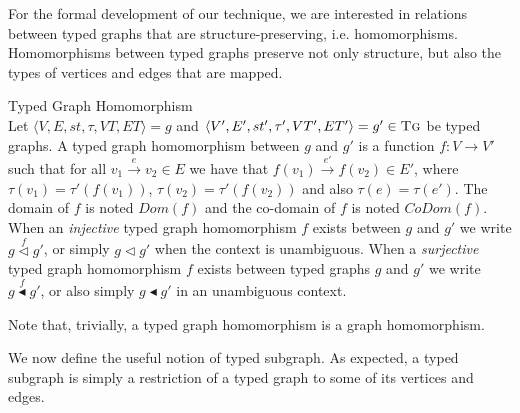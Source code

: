For the formal development of our technique, we are interested in relations between typed graphs that are structure-preserving, i.e. homomorphisms. Homomorphisms between typed graphs preserve not only structure, but also the types of vertices and edges that are mapped.

\begin{definition}{Typed Graph Homomorphism\\}
\label{def:typed_graph_homomorphism}
Let $\langle V,E,st,\tau,VT,ET\rangle=g$ and $\langle V',E',st',\tau',VT',ET'\rangle=g'\in \textsc{Tg}$ be typed graphs. A typed graph homomorphism between $g$ and $g'$ is a function $f:V\rightarrow V'$ such that for all $v_1 \xrightarrow{e} v_2\in E$ we have that $f(v_1) \xrightarrow{e'} f(v_2)\in E'$, where $\tau(v_1)=\tau'(f(v_1))$, $\tau(v_2)=\tau'(f(v_2))$ and also $\tau(e)=\tau(e')$. The domain of $f$ is noted $Dom(f)$ and the co-domain of $f$ is noted $CoDom(f)$. When an \emph{injective} typed graph homomorphism $f$ exists between $g$ and $g'$ we write $g \stackrel{f}{\vartriangleleft} g'$, or simply $g \vartriangleleft g'$ when the context is unambiguous. When a \emph{surjective} typed graph homomorphism $f$ exists between typed graphs $g$ and $g'$ we write $g \stackrel{f}{\blacktriangleleft} g'$, or also simply $g \blacktriangleleft g'$ in an unambiguous context. 
\end{definition}


Note that, trivially, a typed graph homomorphism is a graph homomorphism.





We now define the useful notion of typed subgraph. As expected, a typed subgraph is simply a restriction of a typed graph to some of its vertices and edges. 

